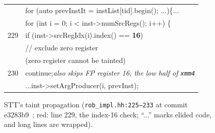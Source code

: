 \providecommand{\figfont}{\fontsize{8pt}{9.5pt}\selectfont}%
\begin{figure}[t]
\centering
{\figfont%
%
\setlength{\fboxsep}{2pt}\setlength{\tabcolsep}{2pt}\renewcommand{\arraystretch}{1}%
\colorbox{sssrcbg}{%
\begin{tabular}{>{\ttfamily}r>{\ttfamily\raggedright\arraybackslash}p{\dimexpr\columnwidth-26pt\relax}}%
225 & for (auto prevInstIt = instList[tid].begin(); ...)\{...\\
228 & \hspace*{0.5em}for (int i = 0; i < inst->numSrcRegs(); i++) \{\\
\rowcolor{ssxmitfill}229 & \hspace*{1em}if (inst->srcRegIdx(i).index() == \textcolor{ssxmitink}{\textbf{16}})\\
\rowcolor{ssxmitfill}    & \hspace*{3em}// exclude zero register\\
\rowcolor{ssxmitfill}    & \hspace*{4.5em}(zero register cannot be tainted)\\
\rowcolor{ssxmitfill}230 & \hspace*{1.5em}continue;\hfill{\rmfamily\itshape\textcolor{ssxmitink}{also skips FP register 16, the low half of \texttt{xmm4}}}\\
233 & \hspace*{2em}...inst->setArgProducer(i, prevInst);%
\end{tabular}}%
}%
\caption{STT's taint propagation (\texttt{rob\_impl.hh:225--233} at commit e3283b9~\cite{sttrepo}; red: line 229, the index-16 check; ``...'' marks elided code, and long lines are wrapped).}
\label{fig:sttxmm4}
\end{figure}
